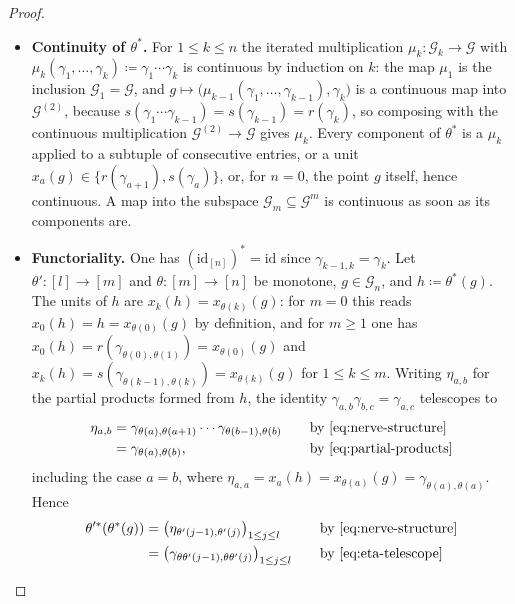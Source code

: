 \documentclass{extracta-temp-26}
\makeatletter
\numberwithin{equation}{section}
\theoremstyle{definition}
\theoremstyle{remark}
\newcommand{\G}{\mathcal{G}}
\newcommand{\id}{\mathrm{id}}
\newcommand{\step}[1]{\textbf{#1}}
\newcommand{\keepwithnext}{\leavevmode\par\nobreak\@afterheading}
\makeatother
\begin{document}
\begin{proof}\keepwithnext
\begin{itemize}
\item \step{Continuity of \(\theta^*\).}
For \(1\le k\le n\) the iterated multiplication \(\mu_k\colon\G_k\to\G\) with \(\mu_k(\gamma_1,\dots,\gamma_k)\coloneqq\gamma_1\cdots\gamma_k\) is continuous by induction on \(k\): the map \(\mu_1\) is the inclusion \(\G_1=\G\), and \(g\mapsto\bigl(\mu_{k-1}(\gamma_1,\dots,\gamma_{k-1}),\gamma_k\bigr)\) is a continuous map into \(\G^{(2)}\), because \(s(\gamma_1\cdots\gamma_{k-1})=s(\gamma_{k-1})=r(\gamma_k)\), so composing with the continuous multiplication \(\G^{(2)}\to\G\) gives \(\mu_k\).
Every component of \(\theta^*\) is a \(\mu_k\) applied to a subtuple of consecutive entries, or a unit \(x_a(g)\in\{r(\gamma_{a+1}),s(\gamma_a)\}\), or, for \(n=0\), the point \(g\) itself, hence continuous.
A map into the subspace \(\G_m\subseteq\G^m\) is continuous as soon as its components are.
\item \step{Functoriality.}
One has \((\id_{[n]})^*=\id\) since \(\gamma_{k-1,k}=\gamma_k\).
Let \(\theta'\colon[l]\to[m]\) and \(\theta\colon[m]\to[n]\) be monotone, \(g\in\G_n\), and \(h\coloneqq\theta^*(g)\).
The units of \(h\) are \(x_k(h)=x_{\theta(k)}(g)\): for \(m=0\) this reads \(x_0(h)=h=x_{\theta(0)}(g)\) by definition, and for \(m\ge 1\) one has \(x_0(h)=r(\gamma_{\theta(0),\theta(1)})=x_{\theta(0)}(g)\) and \(x_k(h)=s(\gamma_{\theta(k-1),\theta(k)})=x_{\theta(k)}(g)\) for \(1\le k\le m\).
Writing \(\eta_{a,b}\) for the partial products formed from \(h\), the identity \(\gamma_{a,b}\gamma_{b,c}=\gamma_{a,c}\) telescopes to
\begin{equation}\label{eq:eta-telescope}
\begin{aligned}
\eta_{a,b}
&=\gamma_{\theta(a),\theta(a+1)}\cdots\gamma_{\theta(b-1),\theta(b)}&&\quad\text{by \eqref{eq:nerve-structure}}\\
&=\gamma_{\theta(a),\theta(b)},&&\quad\text{by \eqref{eq:partial-products}}
\end{aligned}
\end{equation}
including the case \(a=b\), where \(\eta_{a,a}=x_a(h)=x_{\theta(a)}(g)=\gamma_{\theta(a),\theta(a)}\).
Hence
\begin{equation}\label{eq:nerve-functorial}
\begin{aligned}
\theta'^*(\theta^*(g))
&=\bigl(\eta_{\theta'(j-1),\theta'(j)}\bigr)_{1\le j\le l}&&\quad\text{by \eqref{eq:nerve-structure}}\\
&=\bigl(\gamma_{\theta\theta'(j-1),\theta\theta'(j)}\bigr)_{1\le j\le l}&&\quad\text{by \eqref{eq:eta-telescope}}\\

\end{aligned}
\end{equation}
\end{itemize}
\end{proof}
\end{document}
